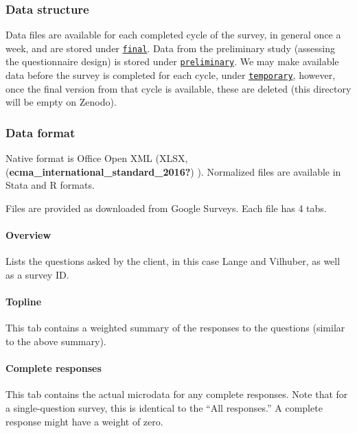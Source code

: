 \documentclass[
]{article}
\begin{document}
\hypertarget{data-structure}{%
\subsubsection{Data structure}\label{data-structure}}

Data files are available for each completed cycle of the survey, in
general once a week, and are stored under \href{final/}{\texttt{final}}.
Data from the preliminary study (assessing the questionnaire design) is
stored under \href{preliminary/}{\texttt{preliminary}}. We may make
available data before the survey is completed for each cycle, under
\href{temporary/}{\texttt{temporary}}, however, once the final version
from that cycle is available, these are deleted (this directory will be
empty on Zenodo).

\hypertarget{data-format}{%
\subsubsection{Data format}\label{data-format}}

Native format is Office Open XML (XLSX,
(\textbf{ecma\_international\_standard\_2016?}) ). Normalized files are
available in Stata and R formats.

Files are provided as downloaded from Google Surveys. Each file has 4
tabs.

\hypertarget{overview}{%
\paragraph{Overview}\label{overview}}

Lists the questions asked by the client, in this case Lange and
Vilhuber, as well as a survey ID.

\hypertarget{topline}{%
\paragraph{Topline}\label{topline}}

This tab contains a weighted summary of the responses to the questions
(similar to the above summary).

\hypertarget{complete-responses}{%
\paragraph{Complete responses}\label{complete-responses}}

This tab contains the actual microdata for any complete responses. Note
that for a single-question survey, this is identical to the ``All
responses.'' A complete response might have a weight of zero.
\end{document}
